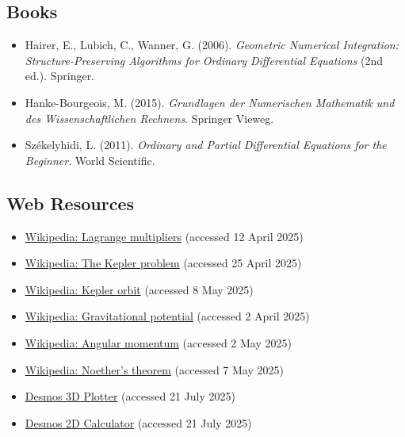 \documentclass[11pt]{article}
\begin{document}
\subsection*{Books}
\begin{itemize}
    \item Hairer, E., Lubich, C., Wanner, G. (2006). \textit{Geometric Numerical Integration: Structure-Preserving Algorithms for Ordinary Differential Equations} (2nd ed.). Springer.
    
    \item Hanke-Bourgeois, M. (2015). \textit{Grundlagen der Numerischen Mathematik und des Wissenschaftlichen Rechnens}. Springer Vieweg.

    \item Székelyhidi, L. (2011). \textit{Ordinary and Partial Differential Equations for the Beginner}. World Scientific.

\end{itemize}

\subsection*{Web Resources}
\begin{itemize}
    \item \href{https://en.wikipedia.org/wiki/Lagrange_multiplier}{Wikipedia: Lagrange multipliers} (accessed 12 April 2025)
    
    \item \href{https://en.wikipedia.org/wiki/Kepler_problem}{Wikipedia: The Kepler problem} (accessed 25 April 2025)
    
    \item \href{https://en.wikipedia.org/wiki/Kepler_orbit#Introduction}{Wikipedia: Kepler orbit} (accessed 8 May 2025)
    
    \item \href{https://en.wikipedia.org/wiki/Gravitational_potential}{Wikipedia: Gravitational potential} (accessed 2 April 2025)
    
    \item \href{https://en.wikipedia.org/wiki/Angular_momentum}{Wikipedia: Angular momentum} (accessed 2 May 2025)
    
    \item \href{https://en.wikipedia.org/wiki/Noether%27s_theorem}{Wikipedia: Noether’s theorem} (accessed 7 May 2025)
    
    \item \href{https://www.desmos.com/3d/rbtwm5soyr}{Desmos 3D Plotter} (accessed 21 July 2025)
    
    \item \href{https://www.desmos.com/calculator/9imhxrravs}{Desmos 2D Calculator} (accessed 21 July 2025)
\end{itemize}
\end{document}
